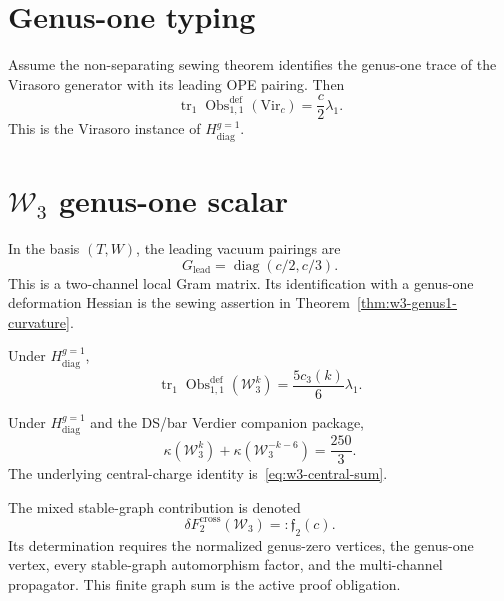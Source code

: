 \section{Genus-one typing}
\label{sec:virasoro-genus-one-computation}

\begin{theorem}
\label{thm:vir-genus1-curvature}
Assume the non-separating sewing theorem identifies the genus-one
trace of the Virasoro generator with its leading OPE pairing.  Then
\[
\operatorname{tr}_1\operatorname{Obs}^{\mathrm{def}}_{1,1}(\mathrm{Vir}_c)
=\frac c2\lambda_1.
\]
This is the Virasoro instance of $H_{\mathrm{diag}}^{g=1}$.
\end{theorem}

\section{$\mathcal W_3$ genus-one scalar}
\label{sec:w3-genus-one-computation}

\begin{computation}
\label{comp:w3-genus1-hessian}
In the basis $(T,W)$, the leading vacuum pairings are
\[
G_{\mathrm{lead}}=\operatorname{diag}(c/2,c/3).
\]
This is a two-channel local Gram matrix.  Its identification with a
genus-one deformation Hessian is the sewing assertion in
Theorem~\ref{thm:w3-genus1-curvature}.
\end{computation}

\begin{theorem}
\label{thm:w3-genus1-curvature}
Under $H_{\mathrm{diag}}^{g=1}$,
\[
\operatorname{tr}_1\operatorname{Obs}^{\mathrm{def}}_{1,1}(\mathcal W_3^k)
=\frac{5c_3(k)}6\lambda_1.
\]
\end{theorem}

\begin{theorem}
\label{thm:w3-genus1-complementarity}
Under $H_{\mathrm{diag}}^{g=1}$ and the DS/bar Verdier companion
package,
\[
\kappa(\mathcal W_3^k)+\kappa(\mathcal W_3^{-k-6})=\frac{250}{3}.
\]
The underlying central-charge identity is~\eqref{eq:w3-central-sum}.
\end{theorem}

\begin{computation}
\label{comp:w3-genus2-multichannel}
The mixed stable-graph contribution is denoted
\begin{equation}\label{eq:w3-cross-channel-genus2}
\delta F_2^{\mathrm{cross}}(\mathcal W_3)=:\mathfrak f_2(c).
\end{equation}
Its determination requires the normalized genus-zero vertices, the
genus-one vertex, every stable-graph automorphism factor, and the
multi-channel propagator.  This finite graph sum is the active proof
obligation.
\end{computation}

